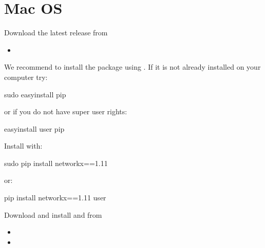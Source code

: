\documentclass[letterpaper,10pt,english]{sphinxmanual}
\begin{document}
\section{Mac OS}
\label{\detokenize{Installation:mac-os}}
Download the latest release from
\begin{itemize}
\item {} 

\end{itemize}

We recommend to install the package using . If it is not already installed on your computer try:

\begin{sphinxVerbatim}[commandchars=\\\{\}]
\PYGZdl{} sudo easy\PYGZus{}install pip
\end{sphinxVerbatim}

or if you do not have super user rights:

\begin{sphinxVerbatim}[commandchars=\\\{\}]
\PYGZdl{} easy\PYGZus{}install \PYGZhy{}\PYGZhy{}user pip
\end{sphinxVerbatim}

Install  with:

\begin{sphinxVerbatim}[commandchars=\\\{\}]
\PYGZdl{} sudo pip install networkx==1.11
\end{sphinxVerbatim}

or:

\begin{sphinxVerbatim}[commandchars=\\\{\}]
\PYGZdl{} pip install networkx==1.11 \PYGZhy{}\PYGZhy{}user
\end{sphinxVerbatim}

Download and install  and  from
\begin{itemize}
\item {} 

\item {} 

\end{itemize}
\end{document}
